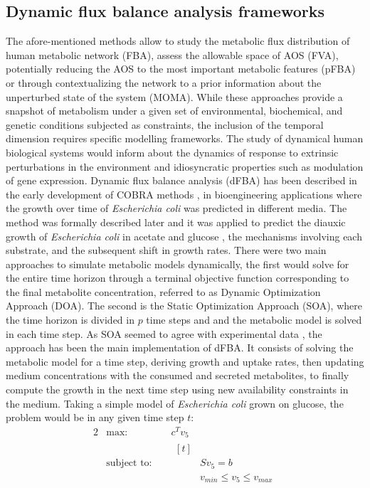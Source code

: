 \subsection{Dynamic flux balance analysis frameworks}
The afore-mentioned methods allow to study the metabolic flux distribution of human metabolic network (FBA), assess the allowable space of AOS (FVA), potentially reducing the AOS to the most important metabolic features (pFBA) or through contextualizing the network to a prior information about the unperturbed state of the system (MOMA). While these approaches provide a snapshot of metabolism under a given set of environmental, biochemical, and genetic conditions subjected as constraints, the inclusion of the temporal dimension requires specific modelling frameworks. The study of dynamical human biological systems would inform about the dynamics of response to extrinsic perturbations in the environment and idiosyncratic properties such as modulation of gene expression.
Dynamic flux balance analysis (dFBA) has been described in the early development of COBRA methods \cite{varma1994stoichiometric}, in bioengineering applications where the growth over time of \textit{Escherichia coli} was predicted in different media. The method was formally described later and it was applied to predict the diauxic growth of \textit{Escherichia coli} in acetate and glucose \cite{mahadevan2002dynamic}, the mechanisms involving each substrate, and the subsequent shift in growth rates. There were two main approaches to simulate metabolic models dynamically, the first would solve for the entire time horizon through a terminal objective function corresponding to the final metabolite concentration, referred to as Dynamic Optimization Approach (DOA). The second is the Static Optimization Approach (SOA), where the time horizon is divided in $p$ time steps and and the metabolic model is solved in each time step. As SOA seemed to agree with experimental data \cite{mahadevan2002dynamic}, the approach has been the main implementation of dFBA. It consists of solving the metabolic model for a time step, deriving growth and uptake rates, then updating medium concentrations with the consumed and secreted metabolites, to finally compute the growth in the next time step using new availability constraints in the medium. Taking a simple model of \textit{Escherichia coli} grown on glucose, the problem would be in any given time step $t$:
\begin{alignat}{2}
  & \text{max: } & & c^{T}v_{5} 
  \label{intro:eq6} \\
   & \text{subject to: }&  & \nonumber
   				\begin{aligned}[t] \\
   				& Sv_{5}=b \\
                & v_{min} \leq v_{5} \leq  v_{max}
                \end{aligned}
                \nonumber
\end{alignat}
